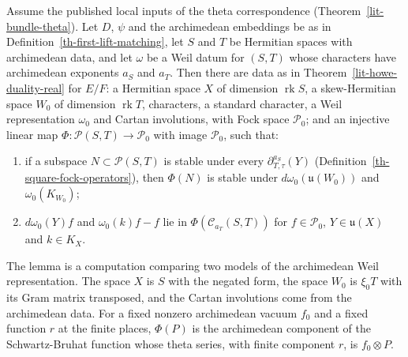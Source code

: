 \begin{lemma}\label{th-square-howe-model}
Assume the published local inputs of the theta correspondence
(Theorem~\ref{lit-bundle-theta}). Let $D$, $\psi$ and the archimedean
embeddings be as in Definition~\ref{th-first-lift-matching}, let $S$ and $T$
be Hermitian spaces with archimedean data, and let $\omega$ be a Weil datum for
$(S,T)$ whose characters have archimedean exponents $a_S$ and $a_T$. Then there
are data as in Theorem~\ref{lit-howe-duality-real} for $E/F$: a Hermitian
space $X$ of dimension $\operatorname{rk}S$, a skew-Hermitian space $W_0$ of
dimension $\operatorname{rk}T$, characters, a standard character, a Weil
representation $\omega_0$ and Cartan involutions, with Fock space
$\mathcal P_0$; and an injective linear map
$\Phi\colon\mathcal P(S,T)\to\mathcal P_0$ with image $\mathcal P_0$, such that:
\begin{enumerate}
\item if a subspace $N\subset\mathcal P(S,T)$ is stable under every
  $\partial^{a_S}_{T,\tau}(Y)$ (Definition~\ref{th-square-fock-operators}),
  then $\Phi(N)$ is stable under $d\omega_0(\mathfrak u(W_0))$ and
  $\omega_0(K_{W_0})$;
\item $d\omega_0(Y)f$ and $\omega_0(k)f-f$ lie in
  $\Phi(\mathcal C_{a_T}(S,T))$ for $f\in\mathcal P_0$, $Y\in\mathfrak u(X)$
  and $k\in K_X$.
\end{enumerate}
\end{lemma}

The lemma is a computation comparing two models of the archimedean Weil
representation. The space $X$ is $S$ with the negated form, the space $W_0$ is
$\xi_0T$ with its Gram matrix transposed, and the Cartan involutions come from
the archimedean data.
For a fixed nonzero archimedean vacuum $f_0$ and a fixed function $r$ at the
finite places, $\Phi(P)$ is the archimedean component of the Schwartz-Bruhat
function whose theta series, with finite component $r$, is $f_0\otimes P$.

